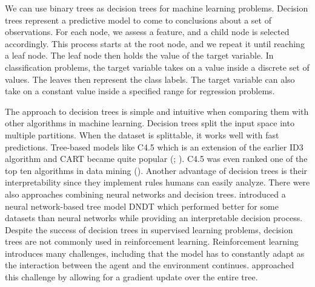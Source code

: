We can use binary trees as decision trees for machine learning problems. Decision trees represent a predictive model to come to conclusions about a set of observations. For each node, we assess a feature, and a child node is selected accordingly. This process starts at the root node, and we repeat it until reaching a leaf node. The leaf node then holds the value of the target variable. In classification problems, the target variable takes on a value inside a discrete set of values. The leaves then represent the class labels. The target variable can also take on a constant value inside a specified range for regression problems.

The approach to decision trees is simple and intuitive when comparing them with other algorithms in machine learning. Decision trees split the input space into multiple partitions. When the dataset is splittable, it works well with fast predictions. Tree-based models like C4.5 which is an extension of the earlier ID3 algorithm and CART became quite popular (\cite{quinlan2014c4}; \cite{breiman2017classification}). C4.5 was even ranked one of the top ten algorithms in data mining (\cite{wu2008top}). Another advantage of decision trees is their interpretability since they implement rules humans can easily analyze. There were also approaches combining neural networks and decision trees. \cite{yang2018deep} introduced a neural network-based tree model DNDT which performed better for some datasets than neural networks while providing an interpretable decision process. Despite the success of decision trees in supervised learning problems, decision trees are not commonly used in reinforcement learning. Reinforcement learning introduces many challenges, including that the model has to constantly adapt as the interaction between the agent and the environment continues. \cite{silva2020optimization} approached this challenge by allowing for a gradient update over the entire tree.

